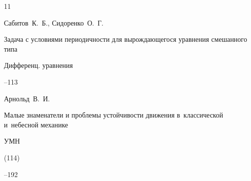 \begin{thebibliography}{11}

\by Сабитов~К.~Б., Сидоренко~О.~Г.

\paper Задача с условиями периодичности для вырождающегося уравнения смешанного типа

\jour Дифференц. уравнения




--113









\by Арнольд~В.~И.

\paper Малые знаменатели и проблемы устойчивости движения в~классической и~небесной механике

\jour УМН



(114)

--192















\end{thebibliography}





\RuDate



\newpage



\makeentitle



